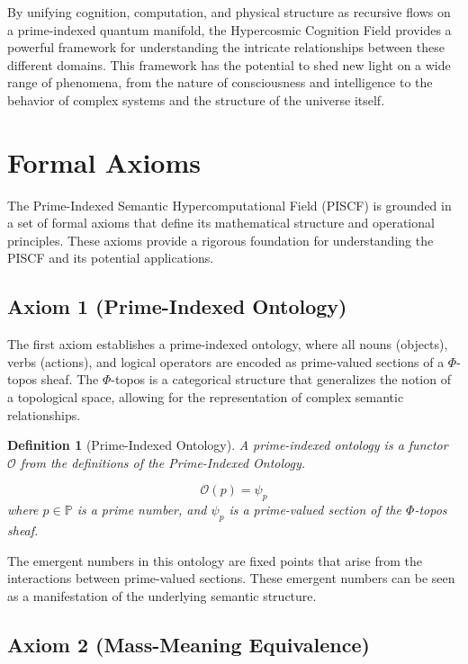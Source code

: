 \documentclass{article}
\theoremstyle{plain}
\newtheorem{definition}{Definition}
\begin{document}
By unifying cognition, computation, and physical structure as recursive flows on a prime-indexed quantum manifold, the Hypercosmic Cognition Field provides a powerful framework for understanding the intricate relationships between these different domains. This framework has the potential to shed new light on a wide range of phenomena, from the nature of consciousness and intelligence to the behavior of complex systems and the structure of the universe itself.
\newpage
\section{Formal Axioms}

The Prime-Indexed Semantic Hypercomputational Field (PISCF) is grounded in a set of formal axioms that define its mathematical structure and operational principles. These axioms provide a rigorous foundation for understanding the PISCF and its potential applications.

\subsection{Axiom 1 (Prime-Indexed Ontology)}

The first axiom establishes a prime-indexed ontology, where all nouns (objects), verbs (actions), and logical operators are encoded as prime-valued sections of a $\Phi$-topos sheaf. The $\Phi$-topos is a categorical structure that generalizes the notion of a topological space, allowing for the representation of complex semantic relationships.

\begin{definition}[Prime-Indexed Ontology]
A prime-indexed ontology is a functor $\mathcal{O}$ from the definitions of the \emph{Prime-Indexed Ontology}.

$$
 \mathcal{O}(p) = \psi_p 
$$
where $p \in \mathbb{P}$ is a prime number, and $\psi_p$ is a prime-valued section of the $\Phi$-topos sheaf.
\end{definition}

The emergent numbers in this ontology are fixed points that arise from the interactions between prime-valued sections. These emergent numbers can be seen as a manifestation of the underlying semantic structure.

\subsection{Axiom 2 (Mass-Meaning Equivalence)}
\end{document}
